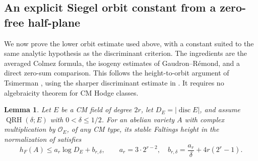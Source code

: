 \documentclass[11pt]{article}
\newtheorem{lemma}[theorem]{Lemma}
\theoremstyle{definition}
\theoremstyle{remark}
\begin{document}
\subsection{An explicit Siegel orbit constant from a zero-free half-plane}
\label{subsec:explicit-siegel-orbit}

We now prove the lower orbit estimate used above, with a constant
suited to the same analytic hypothesis as the discriminant criterion.
The ingredients are the averaged Colmez formula, the isogeny
estimates of Gaudron--R\'emond, and a direct zero-sum comparison.
This follows the height-to-orbit argument of Tsimerman
\cite[proof of Theorem~4.1 and Theorem~5.1]{Tsimerman}, using the
sharper discriminant estimate in \cite[Theorem~1.5(2)]{GR23}.
It requires no algebraicity theorem for CM Hodge classes.

\begin{lemma}\label{lem:halfplane-height}
Let $E$ be a CM field of degree $2r$, let
$D_E=|\operatorname{disc}E|$, and assume
$\operatorname{QRH}(\delta;E)$ with $0<\delta\leq1/2$.
For an abelian variety $A$ with complex multiplication by
$\mathcal O_E$, of any CM type, its stable Faltings height in
the normalization of \cite[\S2.3]{GR14} satisfies
\[
 h_F(A)\leq a_r\log D_E+b_{r,\delta},\qquad
 a_r=3\cdot2^{r-2},\quad
 b_{r,\delta}=\frac{a_r}{\delta}+4r(2^r-1).
\]
\end{lemma}
\end{document}
